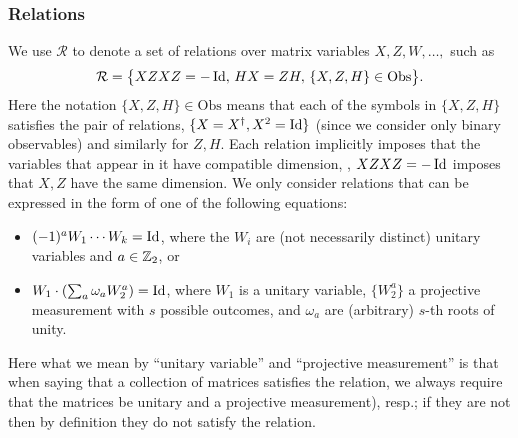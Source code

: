 \documentclass{toc}
\newcommand{\Id}{\ensuremath{\mathop{\rm Id}\nolimits}}
\newcommand{\setft}[1]{\mathrm{#1}}
\newcommand{\Obs}{\setft{Obs}}
\begin{document}
\subsubsection{Relations}

We use $\mathcal{R}$ to denote a set of relations over matrix variables $X,Z,W,\ldots,$ such as
$$\mathcal{R}=\big\{XZXZ=-\Id,\, HX=ZH,\,\{X,Z,H\}\in\Obs\big\}.$$
Here the notation $\{X,Z,H\}\in\Obs$ means that each of the symbols in $\{X,Z,H\}$ satisfies the pair of relations, $\{X=X^\dagger,X^2=\Id\}$ (since we consider only binary observables) and similarly for $Z,H$. Each relation implicitly imposes that the variables that appear in it have compatible dimension, 
\eg, $XZXZ=-\Id$ imposes that $X,Z$ have the same dimension. 
We only consider relations that can be expressed in the form of  one of the following
equations:
\begin{itemize}
  \item  $(-1)^a W_1\cdots W_k = \Id$, where the $W_i$ are (not necessarily distinct) unitary variables and $a\in{\mathbb Z}_2$, or
  \item $ W_1 \cdot ( \sum_a \omega_a W_2^a)=\Id$, where $W_1$ is a unitary variable, $\{W_2^a\}$ a projective measurement with $s$ possible outcomes, and $\omega_a$ are (arbitrary) $s$-th roots of unity.
\end{itemize}
Here what we mean by ``unitary variable''
and ``projective measurement''  %
is that when saying that a collection of matrices %
satisfies  %
the relation, we always require that the matrices %
be  %
unitary and a projective measurement), resp.; %
if they are not then by definition they do not satisfy the relation. 
\end{document}
